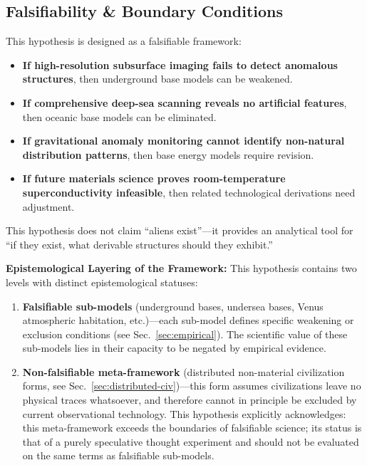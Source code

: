 \documentclass[aps,prd,twocolumn,superscriptaddress,nofootinbib]{revtex4-2}
\begin{document}
\subsection{Falsifiability \& Boundary Conditions}\label{sec:falsifiability}

This hypothesis is designed as a falsifiable framework:

\begin{itemize}
  \item \textbf{If high-resolution subsurface imaging fails to detect anomalous structures}, then underground base models can be weakened.
  \item \textbf{If comprehensive deep-sea scanning reveals no artificial features}, then oceanic base models can be eliminated.
  \item \textbf{If gravitational anomaly monitoring cannot identify non-natural distribution patterns}, then base energy models require revision.
  \item \textbf{If future materials science proves room-temperature superconductivity infeasible}, then related technological derivations need adjustment.
\end{itemize}

This hypothesis does not claim ``aliens exist''---it provides an analytical tool for ``if they exist, what derivable structures should they exhibit.''

\textbf{Epistemological Layering of the Framework:} This hypothesis contains two levels with distinct epistemological statuses:

\begin{enumerate}
  \item \textbf{Falsifiable sub-models} (underground bases, undersea bases, Venus atmospheric habitation, etc.)---each sub-model defines specific weakening or exclusion conditions (see Sec.~\ref{sec:empirical}). The scientific value of these sub-models lies in their capacity to be negated by empirical evidence.
  \item \textbf{Non-falsifiable meta-framework} (distributed non-material civilization forms, see Sec.~\ref{sec:distributed-civ})---this form assumes civilizations leave no physical traces whatsoever, and therefore cannot in principle be excluded by current observational technology. This hypothesis explicitly acknowledges: this meta-framework exceeds the boundaries of falsifiable science; its status is that of a purely speculative thought experiment and should not be evaluated on the same terms as falsifiable sub-models.
\end{enumerate}
\end{document}
